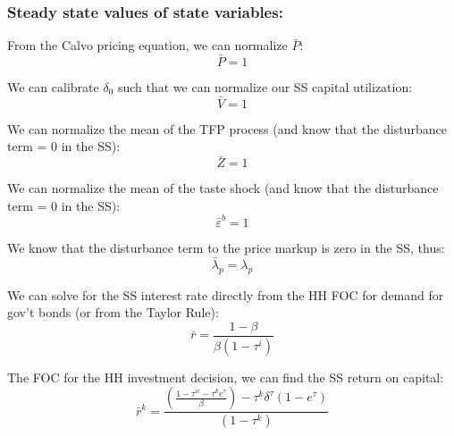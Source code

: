 

\subsubsection{Steady state values of state variables:}

From the Calvo pricing equation, we can normalize $\bar{P}$:
\begin{equation}
\bar{P} = 1
\end{equation}

We can calibrate $\delta_{0}$ such that we can normalize our SS capital utilization:
\begin{equation}
\bar{V} = 1
\end{equation}

We can normalize the mean of the TFP process (and know that the disturbance term = 0 in the SS):
\begin{equation}
\bar{Z} = 1
\end{equation}

We can normalize the mean of the taste shock (and know that the disturbance term = 0 in the SS):
\begin{equation}
\bar{\varepsilon}^{b} = 1
\end{equation}

We know that the disturbance term to the price markup is zero in the SS, thus:
\begin{equation}
\bar{\lambda}_{p} = \lambda_{p}
\end{equation}

We can solve for the SS interest rate directly from the HH FOC for demand for gov't bonds (or from the Taylor Rule):
\begin{equation}
\bar{r} = \frac{1-\beta}{\beta(1-\tau^{i})}
\end{equation}

The FOC for the HH investment decision, we can find the SS return on capital:
\begin{equation}
\bar{r}^{k} = \frac{\left(\frac{1-\tau^{ic}-\tau^{k}e^{\tau}}{\beta}\right)-\tau^{k}\delta^{\tau}(1-e^{\tau})}{(1-\tau^{k})}
\end{equation}

